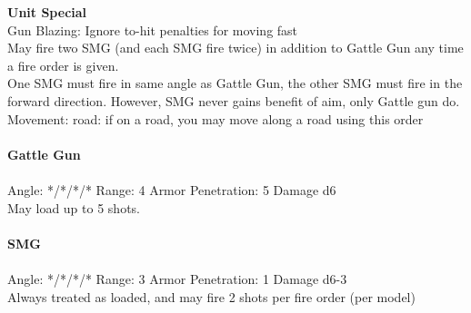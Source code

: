 {\bf Unit Special} \\
Gun Blazing: Ignore to-hit penalties for moving fast\\ May fire two SMG (and each SMG fire twice) in addition to Gattle Gun any time a fire order is given.\\ One SMG must fire in same angle as Gattle Gun, the other SMG must fire in the forward direction. However, SMG never gains benefit of aim, only Gattle gun do.\\ Movement: road: if on a road, you may move along a road using this order
\ \\
\ \\
{\bf Gattle Gun } \\
\ \\
Angle: */*/*/* Range: 4 Armor Penetration: 5 Damage d6 \\
\indent May load up to 5 shots. \\



\ \\
{\bf SMG } \\
\ \\
Angle: */*/*/* Range: 3 Armor Penetration: 1 Damage d6-3 \\
\indent Always treated as loaded, and may fire 2 shots per fire order (per model) \\





